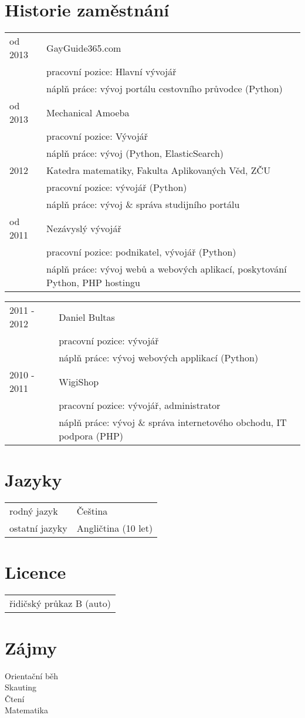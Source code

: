 \documentclass[12pt,a4paper]{article}
\begin{document}
\section*{Historie zaměstnání}
\begin{tabular}{@{}p{2cm}l}
od 2013 & GayGuide365.com\\
 & pracovní pozice: Hlavní vývojář \\
 & náplň práce: vývoj portálu cestovního průvodce (Python)\\
od 2013 & Mechanical Amoeba\\
 & pracovní pozice: Vývojář \\
 & náplň práce: vývoj (Python, ElasticSearch)\\
2012  & Katedra matematiky, Fakulta Aplikovaných Věd, ZČU \\
 & pracovní pozice: vývojář (Python)\\
 & náplň práce: vývoj \& správa studijního portálu\\
od 2011 & Nezávyslý vývojář \\
 & pracovní pozice: podnikatel, vývojář (Python)\\
 & náplň práce: vývoj webů a webových aplikací, poskytování Python, PHP hostingu\\
\end{tabular}

\begin{tabular}{@{}p{2cm}l}
2011 - 2012 & Daniel Bultas\\
 & pracovní pozice: vývojář\\
 & náplň práce: vývoj webových applikací (Python)\\
2010 - 2011 & WigiShop\\
 & pracovní pozice: vývojář, administrator\\
 & náplň práce: vývoj \& správa internetového obchodu, IT podpora (PHP)\\
\end{tabular}

\section*{Jazyky}
\begin{tabular}{@{}p{4cm}l}
rodný jazyk & Čeština\\
ostatní jazyky & Angličtina (10 let)\\
\end{tabular}

\section*{Licence}
\begin{tabular}{@{}l}
řidičský průkaz B (auto)\\
\end{tabular}

\section*{Zájmy}
Orientační běh\\
Skauting\\
Čtení\\
Matematika\\
\end{document}
